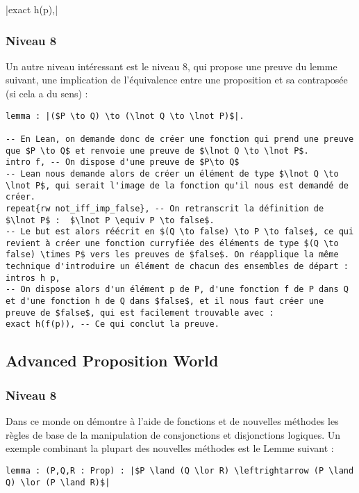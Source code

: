 |exact h(p),| 

\subsubsection{Niveau 8}
Un autre niveau intéressant est le niveau 8, qui propose une preuve du lemme suivant, une implication de l'équivalence entre une proposition et sa contraposée (si cela a du sens) : 

\begin{verbatim}
lemma : |($P \to Q) \to (\lnot Q \to \lnot P)$|. 

-- En Lean, on demande donc de créer une fonction qui prend une preuve que $P \to Q$ et renvoie une preuve de $\lnot Q \to \lnot P$.
intro f, -- On dispose d'une preuve de $P\to Q$ 
-- Lean nous demande alors de créer un élément de type $\lnot Q \to \lnot P$, qui serait l'image de la fonction qu'il nous est demandé de créer.
repeat{rw not_iff_imp_false}, -- On retranscrit la définition de $\lnot P$ :  $\lnot P \equiv P \to false$.
-- Le but est alors réécrit en $(Q \to false) \to P \to false$, ce qui revient à créer une fonction curryfiée des éléments de type $(Q \to false) \times P$ vers les preuves de $false$. On réapplique la même technique d'introduire un élément de chacun des ensembles de départ : 
intros h p,
-- On dispose alors d'un élément p de P, d'une fonction f de P dans Q et d'une fonction h de Q dans $false$, et il nous faut créer une preuve de $false$, qui est facilement trouvable avec : 
exact h(f(p)), -- Ce qui conclut la preuve. 
\end{verbatim}


\subsection{Advanced Proposition World}
\subsubsection{Niveau 8}
Dans ce monde on démontre à l'aide de fonctions et de nouvelles méthodes les règles de base de la manipulation de consjonctions et disjonctions logiques. Un exemple combinant la plupart des nouvelles méthodes est le Lemme suivant : 


\begin{verbatim}
lemma : (P,Q,R : Prop) : |$P \land (Q \lor R) \leftrightarrow (P \land Q) \lor (P \land R)$|
\end{verbatim}

